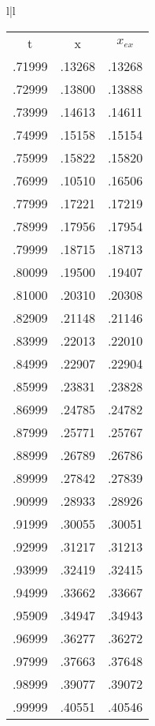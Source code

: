 \begin{figure}
    \centering
    \begin{tabular}{l|l}
        \begin{tabular}{ccc}
            t &  x  & $x_{ex}$ \\
            .71999 & .13268 & .13268 \\
            .72999 & .13800 & .13888 \\
            .73999 & .14613 & .14611 \\
            .74999 & .15158 & .15154 \\
            .75999 & .15822 & .15820 \\
            .76999 & .10510 & .16506 \\
            .77999 & .17221 & .17219 \\
            .78999 & .17956 & .17954 \\
            .79999 & .18715 & .18713 \\
            .80099 & .19500 & .19407 \\
            .81000 & .20310 & .20308 \\
            .82909 & .21148 & .21146 \\
            .83999 & .22013 & .22010 \\
            .84999 & .22907 & .22904 \\
            .85999 & .23831 & .23828 \\
            .86999 & .24785 & .24782 \\
            .87999 & .25771 & .25767 \\
            .88999 & .26789 & .26786 \\
            .89999 & .27842 & .27839 \\
            .90999 & .28933 & .28926 \\
            .91999 & .30055 & .30051 \\
            .92999 & .31217 & .31213 \\
            .93999 & .32419 & .32415 \\
            .94999 & .33662 & .33667 \\
            .95909 & .34947 & .34943 \\
            .96999 & .36277 & .36272 \\
            .97999 & .37663 & .37648 \\
            .98999 & .39077 & .39072 \\
            .99999 & .40551 & .40546 \\

\end{tabular}
\end{tabular}
\end{figure}
